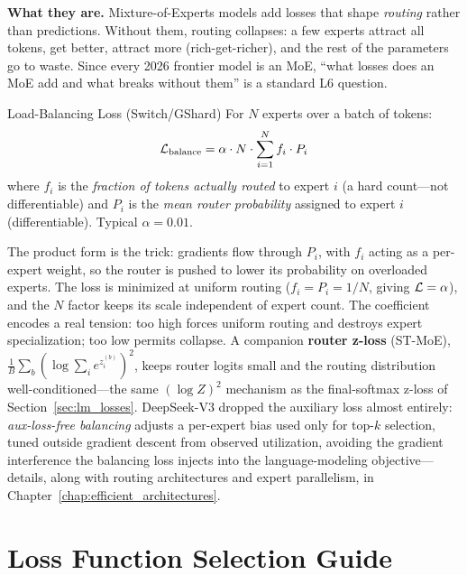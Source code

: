 \textbf{What they are.} Mixture-of-Experts models add losses that shape \textit{routing} rather than predictions. Without them, routing collapses: a few experts attract all tokens, get better, attract more (rich-get-richer), and the rest of the parameters go to waste. Since every 2026 frontier model is an MoE, ``what losses does an MoE add and what breaks without them'' is a standard L6 question.

\begin{mathresult}{Load-Balancing Loss (Switch/GShard)}
For $N$ experts over a batch of tokens:
\begin{equation}
\mathcal{L}_{\text{balance}} = \alpha \cdot N \cdot \sum_{i=1}^{N} f_i \cdot P_i
\end{equation}
where $f_i$ is the \textit{fraction of tokens actually routed} to expert $i$ (a hard count---not differentiable) and $P_i$ is the \textit{mean router probability} assigned to expert $i$ (differentiable). Typical $\alpha = 0.01$.
\end{mathresult}

The product form is the trick: gradients flow through $P_i$, with $f_i$ acting as a per-expert weight, so the router is pushed to lower its probability on overloaded experts. The loss is minimized at uniform routing ($f_i = P_i = 1/N$, giving $\mathcal{L} = \alpha$), and the $N$ factor keeps its scale independent of expert count. The coefficient encodes a real tension: too high forces uniform routing and destroys expert specialization; too low permits collapse. A companion \textbf{router z-loss} (ST-MoE), $\frac{1}{B}\sum_b (\log \sum_i e^{z_i^{(b)}})^2$, keeps router logits small and the routing distribution well-conditioned---the same $(\log Z)^2$ mechanism as the final-softmax z-loss of Section~\ref{sec:lm_losses}. DeepSeek-V3 dropped the auxiliary loss almost entirely: \textit{aux-loss-free balancing} adjusts a per-expert bias used only for top-$k$ selection, tuned outside gradient descent from observed utilization, avoiding the gradient interference the balancing loss injects into the language-modeling objective---details, along with routing architectures and expert parallelism, in Chapter~\ref{chap:efficient_architectures}.

\section{Loss Function Selection Guide}
\label{sec:loss_selection}


